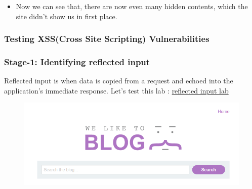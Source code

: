 \documentclass[
	a4paper, %
	12pt, %
]{CSSullivanBusinessReport}
\begin{document}
\begin{fullwidth}
\begin{itemize}
\begin{figure}[H]
\end{figure}
\item Now we can see that, there are now even many hidden contents, which the site didn’t show us in first place.    
\end{itemize}

\subsubsection*{Testing XSS(Cross Site Scripting) Vulnerabilities}

\subsubsection*{Stage-1: Identifying reflected input}
Reflected input is when data is copied from a request and echoed into the 
application's immediate response. \newline
Let's test this lab : \href{https://portswigger.net/web-security/cross-site-scripting/reflected/lab-html-context-nothing-encoded}{\color{orange}reflected \textunderscore input \textunderscore lab}
\begin{figure}[H]
    \centering
    \includegraphics[width=0.75\linewidth]{Images/searchBox.png}
    

\end{figure}
\end{fullwidth}
\end{document}

